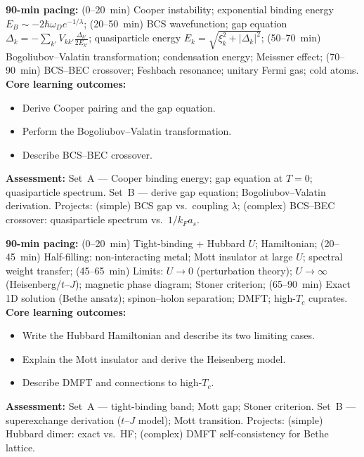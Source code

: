 \documentclass[11pt,a4paper]{article}
\begin{document}
\medskip

\begin{tcolorbox}[modulebox, title={Module~II.4 / L09: Interacting Fermions and BCS Theory}]
\textbf{90-min pacing:} (0--20~min) Cooper instability; exponential binding energy $E_B\sim-2\hbar\omega_D e^{-1/\lambda}$; (20--50~min) BCS wavefunction; gap equation $\Delta_k=-\sum_{k'}V_{kk'}\tfrac{\Delta_{k'}}{2E_{k'}}$; quasiparticle energy $E_k=\sqrt{\xi_k^2+|\Delta_k|^2}$; (50--70~min) Bogoliubov--Valatin transformation; condensation energy; Meissner effect; (70--90~min) BCS--BEC crossover; Feshbach resonance; unitary Fermi gas; cold atoms.
\medskip\textbf{Core learning outcomes:}
\begin{itemize}[leftmargin=1.4em,topsep=2pt,itemsep=1pt]
  \item Derive Cooper pairing and the gap equation.
  \item Perform the Bogoliubov--Valatin transformation.
  \item Describe BCS--BEC crossover.
\end{itemize}
\medskip\textbf{Assessment:}
Set~A --- Cooper binding energy; gap equation at $T=0$; quasiparticle spectrum.
Set~B --- derive gap equation; Bogoliubov--Valatin derivation.
Projects: (simple) BCS gap vs.\ coupling $\lambda$; (complex) BCS--BEC crossover: quasiparticle spectrum vs.\ $1/k_Fa_s$.
\end{tcolorbox}

\medskip

\begin{tcolorbox}[modulebox, title={Module~II.4 / L10: The Hubbard Model}]
\textbf{90-min pacing:} (0--20~min) Tight-binding + Hubbard $U$; Hamiltonian; (20--45~min) Half-filling: non-interacting metal; Mott insulator at large $U$; spectral weight transfer; (45--65~min) Limits: $U\to0$ (perturbation theory); $U\to\infty$ (Heisenberg/$t$--$J$); magnetic phase diagram; Stoner criterion; (65--90~min) Exact 1D solution (Bethe ansatz); spinon--holon separation; DMFT; high-$T_c$ cuprates.
\medskip\textbf{Core learning outcomes:}
\begin{itemize}[leftmargin=1.4em,topsep=2pt,itemsep=1pt]
  \item Write the Hubbard Hamiltonian and describe its two limiting cases.
  \item Explain the Mott insulator and derive the Heisenberg model.
  \item Describe DMFT and connections to high-$T_c$.
\end{itemize}
\medskip\textbf{Assessment:}
Set~A --- tight-binding band; Mott gap; Stoner criterion.
Set~B --- superexchange derivation ($t$--$J$ model); Mott transition.
Projects: (simple) Hubbard dimer: exact vs.\ HF; (complex) DMFT self-consistency for Bethe lattice.
\end{tcolorbox}
\end{document}
